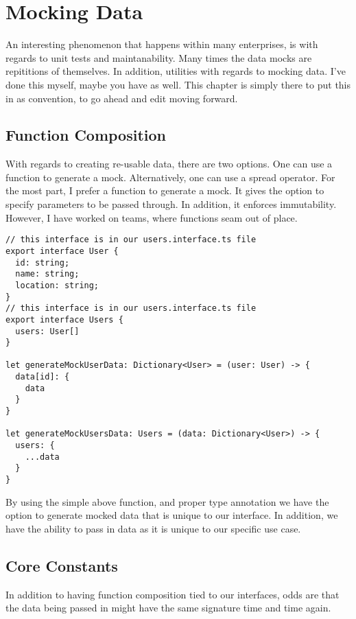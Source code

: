 \maketitle{}
\section{ Mocking Data }
An interesting phenomenon that happens within many enterprises, is with regards
to unit tests and maintanability. Many times the data mocks are repititions of
themselves. In addition, utilities with regards to mocking data. I've done this
myself, maybe you have as well. This chapter is simply there to put this in as
convention, to go ahead and edit moving forward.

\subsection{ Function Composition }
With regards to creating re-usable data, there are two options. One can use a
function to generate a mock. Alternatively, one can use a spread operator. For
the most part, I prefer a function to generate a mock. It gives the option to
specify parameters to be passed through. In addition, it enforces immutability.
However, I have worked on teams, where functions seam out of place.

\begin{lstlisting}
// this interface is in our users.interface.ts file
export interface User {
  id: string;
  name: string;
  location: string;
}
// this interface is in our users.interface.ts file
export interface Users {
  users: User[]
}

let generateMockUserData: Dictionary<User> = (user: User) -> {
  data[id]: {
    data
  }
}

let generateMockUsersData: Users = (data: Dictionary<User>) -> {
  users: {
    ...data
  }
}
\end{lstlisting}

By using the simple above function, and proper type annotation we have the
option to generate mocked data that is unique to our interface. In addition, we
have the ability to pass in data as it is unique to our specific use case.

\subsection{ Core Constants }
In addition to having function composition tied to our interfaces, odds are that
the data being passed in might have the same signature time and time again.

